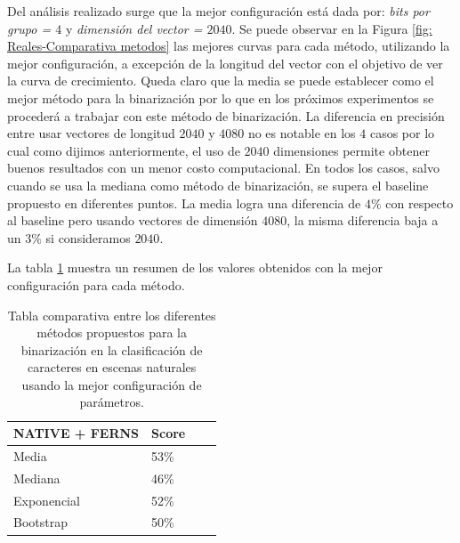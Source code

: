 	Del análisis realizado surge que la mejor configuración está dada por: \textit{bits por grupo = $4$} y \textit{dimensión del vector = $2040$}. Se puede observar en la Figura \ref{fig: Reales-Comparativa metodos} las mejores curvas para cada método, utilizando la mejor configuración, a excepción de la longitud del vector con el objetivo de ver la curva de crecimiento. Queda claro que la media se puede establecer como el mejor método para la binarización por lo que en los próximos experimentos se procederá a trabajar con este método de binarización. La diferencia en precisión entre usar vectores de longitud $2040$ y $4080$ no es notable en los $4$ casos por lo cual como dijimos anteriormente, el uso de $2040$ dimensiones permite ob\-te\-ner buenos resultados con un menor costo computacional. En todos los casos, salvo cuando se usa la mediana como método de binarización, se supera el baseline propuesto en diferentes puntos. La media logra una diferencia de $4\%$ con respecto al baseline pero usando vectores de dimensión $4080$, la misma diferencia baja a un $3\%$ si consideramos $2040$.

	La tabla \ref{table: reales-comparativa} muestra un resumen de los valores obtenidos con la mejor configuración para cada método.

	\begin{table}
		\centering
		\begin{tabular}{ | l | l | l | p{5cm} |}
    			\hline
    				\textbf{NATIVE + FERNS} & \textbf{Score} \\ \hline
    				Media & 53\% \\ \hline
    				Mediana & 46\%\\ \hline
    				Exponencial & 52\% \\ \hline
    				Bootstrap & 50\%\\
    			\hline
    		\end{tabular}
    		\caption[Resultados imágenes naturales]{Tabla comparativa entre los diferentes métodos propuestos para la binarización en la clasificación de caracteres en escenas naturales usando la mejor configuración de parámetros.}
    		\label{table: reales-comparativa}
    	\end{table}





	